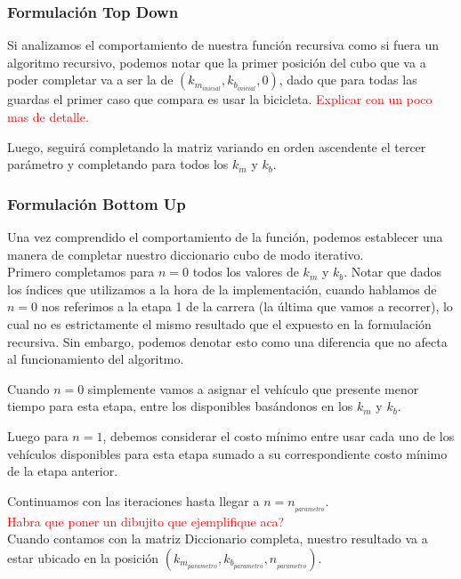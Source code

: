 \subsubsection*{Formulaci\'on Top Down}

Si analizamos el comportamiento de nuestra funci\'on recursiva como si fuera un algoritmo recursivo, podemos notar que la primer posici\'on del cubo que va a poder completar
va a ser la de $(k_{m_{inicial}},k_{b_{inicial}},0)$, dado que para todas las guardas el primer caso que compara es usar la bicicleta. \textcolor{red}{Explicar con un poco mas de detalle.}

Luego, seguir\'a completando la matriz variando en orden ascendente el tercer par\'ametro y completando para todos los $k_m$ y $k_b$.

\subsubsection*{Formulaci\'on Bottom Up}


Una vez comprendido el comportamiento de la funci\'on, podemos establecer una manera de completar nuestro diccionario cubo de modo iterativo.\\

Primero completamos para $n=0$ todos los valores de $k_m$ y $k_b$. Notar que dados los \'indices que utilizamos a la hora de la implementaci\'on, cuando hablamos de $n=0$ nos referimos a la etapa 1 de la carrera (la \'ultima que vamos a recorrer), lo cual no es estrictamente el mismo resultado que el expuesto en la formulaci\'on recursiva. Sin embargo, podemos denotar esto como una diferencia que no afecta al funcionamiento del algoritmo.

Cuando $n=0$ simplemente vamos a asignar el veh\'iculo que presente menor tiempo para esta etapa, entre los disponibles bas\'andonos en los $k_m$ y $k_b$.

Luego para $n=1$, debemos considerar el costo m\'inimo entre usar cada uno de los veh\'iculos disponibles para esta etapa sumado a su correspondiente costo m\'inimo de la etapa anterior.

Continuamos con las iteraciones hasta llegar a $n=n_{_{parametro}}$.\\

\textcolor{red}{Habra que poner un dibujito que ejemplifique aca?}\\

Cuando contamos con la matriz Diccionario completa, nuestro resultado va a estar ubicado en la posici\'on $(k_{m_{parametro}},k_{b_{parametro}},n_{_{parametro}})$.\\

